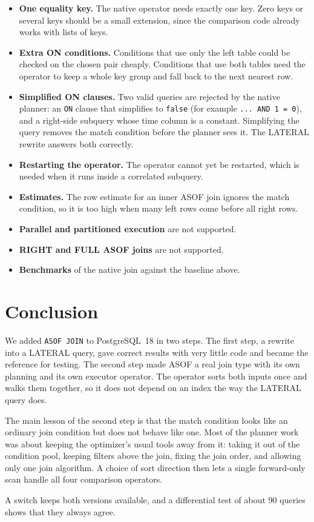 \documentclass[11pt,a4paper]{article}
\newcommand{\code}[1]{\texttt{#1}}
\begin{document}
\begin{itemize}
  \item \textbf{One equality key.} The native operator needs exactly one key. Zero keys
        or several keys should be a small extension, since the comparison code already
        works with lists of keys.
  \item \textbf{Extra ON conditions.} Conditions that use only the left table could be
        checked on the chosen pair cheaply. Conditions that use both tables need the
        operator to keep a whole key group and fall back to the next nearest row.
  \item \textbf{Simplified ON clauses.} Two valid queries are rejected by the native
        planner: an \code{ON} clause that simplifies to \code{false} (for example
        \code{... AND 1 = 0}), and a right-side subquery whose time column is a constant.
        Simplifying the query removes the match condition before the planner sees it.
        The LATERAL rewrite answers both correctly.
  \item \textbf{Restarting the operator.} The operator cannot yet be restarted, which is
        needed when it runs inside a correlated subquery.
  \item \textbf{Estimates.} The row estimate for an inner ASOF join ignores the match
        condition, so it is too high when many left rows come before all right rows.
  \item \textbf{Parallel and partitioned execution} are not supported.
  \item \textbf{RIGHT and FULL ASOF joins} are not supported.
  \item \textbf{Benchmarks} of the native join against the baseline above.
\end{itemize}

\section{Conclusion}

We added \code{ASOF JOIN} to PostgreSQL~18 in two steps. The first step, a rewrite into a
LATERAL query, gave correct results with very little code and became the reference for
testing. The second step made ASOF a real join type with its own planning and its own
executor operator. The operator sorts both inputs once and walks them together, so it
does not depend on an index the way the LATERAL query does.

The main lesson of the second step is that the match condition looks like an ordinary
join condition but does not behave like one. Most of the planner work was about keeping
the optimizer's usual tools away from it: taking it out of the condition pool, keeping
filters above the join, fixing the join order, and allowing only one join algorithm. A
choice of sort direction then lets a single forward-only scan handle all four comparison
operators.

A switch keeps both versions available, and a differential test of about 90 queries
shows that they always agree.
\end{document}
